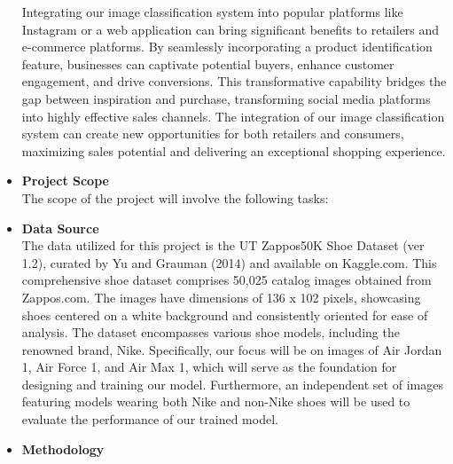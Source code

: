 \documentclass{article}
\begin{document}
\begin{itemize}
Integrating our image classification system into popular platforms like Instagram or a web application can bring significant benefits to retailers and e-commerce platforms. By seamlessly incorporating a product identification feature, businesses can captivate potential buyers, enhance customer engagement, and drive conversions. This transformative capability bridges the gap between inspiration and purchase, transforming social media platforms into highly effective sales channels. The integration of our image classification system can create new opportunities for both retailers and consumers, maximizing sales potential and delivering an exceptional shopping experience. 
	   \item[] \textbf{Project Scope} \\
		The scope of the project will involve the following tasks: 
            \item[] \textbf{Data Source} \\
		The data utilized for this project is the UT Zappos50K Shoe Dataset (ver 1.2), curated by Yu and Grauman (2014) and available on Kaggle.com. This comprehensive shoe dataset comprises 50,025 catalog images obtained from Zappos.com. The images have dimensions of 136 x 102 pixels, showcasing shoes centered on a white background and consistently oriented for ease of analysis. The dataset encompasses various shoe models, including the renowned brand, Nike. Specifically, our focus will be on images of Air Jordan 1, Air Force 1, and Air Max 1, which will serve as the foundation for designing and training our model. Furthermore, an independent set of images featuring models wearing both Nike and non-Nike shoes will be used to evaluate the performance of our trained model.  
            \item[] \textbf{Methodology} \\

\end{itemize}
\end{document}

